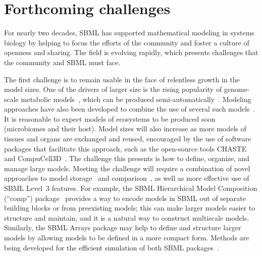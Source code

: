 \documentclass{sbml-paper}
\begin{document}
\hrulefill
\newpage

\section*{Forthcoming challenges}

For nearly two decades, SBML has supported mathematical modeling in systems biology by helping to focus the efforts of the community and foster a culture of openness and sharing.  The field is evolving rapidly, which presents challenges that the community and SBML must face.

The first challenge is to remain usable in the face of relentless growth in the model sizes.  One of the drivers of larger size is the rising popularity of genome-scale metabolic models~\citep{Bordbar2014a}, which can be produced semi-automatically~\citep{henry2010high, buchel2013path2models, Magnusdottir2017}.  Modeling approaches have also been developed to combine the use of several such models~\citep[e.g.,][]{bordbar2011multi}.  It is reasonable to expect models of ecosystems to be produced soon (\eg microbiomes and their host).  Model sizes will also increase as more models of tissues and organs are exchanged and reused, encouraged by the use of software packages that facilitate this approach, such as the open-source tools CHASTE~\citep{mirams2013chaste} and CompuCell3D~\citep{swat2012multi}.  The challenge this presents is how to define, organize, and manage large models.  Meeting the challenge will require a combination of novel approaches to model storage~\citep[e.g.,][]{Henkel2015combininga} and comparison~\citep[e.g.,][]{Scharm2016algorithm, Scharm2016comodi}, as well as more effective use of SBML Level~3 features.  For example, the SBML Hierarchical Model Composition (``comp'') package~\citep{Smith2015} provides a way to encode models in SBML out of separate building blocks or from preexisting models; this can make larger models easier to structure and maintain, and it is a natural way to construct multiscale models.  Similarly, the SBML Arrays package may help to define and structure larger models by allowing models to be defined in a more compact form.  Methods are being developed for the efficient simulation of both SBML packages~\citep{watanabe2014hierarchical, watanabe2016efficient}.
\end{document}
